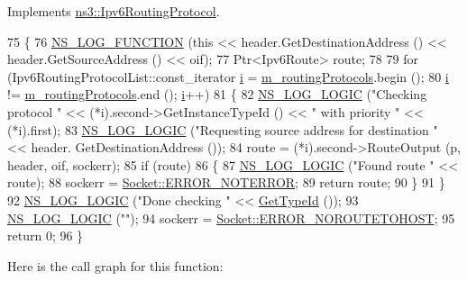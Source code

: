 Implements \hyperlink{classns3_1_1Ipv6RoutingProtocol_a92e79a0364ad272392ee635ffe50644d}{ns3\+::\+Ipv6\+Routing\+Protocol}.


\begin{DoxyCode}
75 \{
76   \hyperlink{log-macros-disabled_8h_a90b90d5bad1f39cb1b64923ea94c0761}{NS\_LOG\_FUNCTION} (\textcolor{keyword}{this} << header.GetDestinationAddress () << header.GetSourceAddress () << 
      oif);
77   Ptr<Ipv6Route> route;
78 
79   \textcolor{keywordflow}{for} (Ipv6RoutingProtocolList::const\_iterator \hyperlink{bernuolliDistribution_8m_a6f6ccfcf58b31cb6412107d9d5281426}{i} = \hyperlink{classns3_1_1Ipv6ListRouting_aec46de403a1c73088ce952d7cbd804e8}{m\_routingProtocols}.begin ();
80        \hyperlink{bernuolliDistribution_8m_a6f6ccfcf58b31cb6412107d9d5281426}{i} != \hyperlink{classns3_1_1Ipv6ListRouting_aec46de403a1c73088ce952d7cbd804e8}{m\_routingProtocols}.end (); \hyperlink{bernuolliDistribution_8m_a6f6ccfcf58b31cb6412107d9d5281426}{i}++)
81     \{
82       \hyperlink{group__logging_ga88acd260151caf2db9c0fc84997f45ce}{NS\_LOG\_LOGIC} (\textcolor{stringliteral}{"Checking protocol "} << (*i).second->GetInstanceTypeId () << \textcolor{stringliteral}{" with
       priority "} << (*i).first);
83       \hyperlink{group__logging_ga88acd260151caf2db9c0fc84997f45ce}{NS\_LOG\_LOGIC} (\textcolor{stringliteral}{"Requesting source address for destination "} << header.
      GetDestinationAddress ());
84       route = (*i).second->RouteOutput (p, header, oif, sockerr);
85       \textcolor{keywordflow}{if} (route)
86         \{
87           \hyperlink{group__logging_ga88acd260151caf2db9c0fc84997f45ce}{NS\_LOG\_LOGIC} (\textcolor{stringliteral}{"Found route "} << route);
88           sockerr = \hyperlink{classns3_1_1Socket_ada1328c5ae0c28cb2a982caf8f6d6ccaaa7eb006d73c5ad0117c5591fcb3469f7}{Socket::ERROR\_NOTERROR};
89           \textcolor{keywordflow}{return} route;
90         \}
91     \}
92   \hyperlink{group__logging_ga88acd260151caf2db9c0fc84997f45ce}{NS\_LOG\_LOGIC} (\textcolor{stringliteral}{"Done checking "} << \hyperlink{classns3_1_1Ipv6ListRouting_a2a1e3ee20de076b049451e4a675e438b}{GetTypeId} ());
93   \hyperlink{group__logging_ga88acd260151caf2db9c0fc84997f45ce}{NS\_LOG\_LOGIC} (\textcolor{stringliteral}{""});
94   sockerr = \hyperlink{classns3_1_1Socket_ada1328c5ae0c28cb2a982caf8f6d6ccaa0f8ecb5a4ddbce3bade35fa12c3d49e8}{Socket::ERROR\_NOROUTETOHOST};
95   \textcolor{keywordflow}{return} 0;
96 \}
\end{DoxyCode}


Here is the call graph for this function\+:


